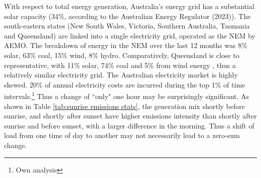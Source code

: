 With respect to total energy generation, Australia's energy grid has a substantial solar capacity (34\%, according to the Australian Energy Regulator (2023)\nocite{state_of_the_market}). The south-eastern states (New South Wales, Victoria, Southern Australia, Tasmania and Queensland) are linked into a single electricity grid, operated as the \ac{NEM} by \ac{AEMO}. 
The breakdown of energy in the \ac{NEM} over the last 12 months was 8\% solar, 63\% coal, 15\% wind, 8\% hydro.
Comparatively, Queensland is close to representative, with 11\%  solar, 74\% coal and 5\% from wind energy \parencite{aemo_fuel_mix}, thus a relatively similar electricity grid.
The Australian electricity market is highly skewed.
20\% of annual electricity costs are incurred during the top 1\% of time intervals.\footnote{Own analysis}
Thus a change of ``only" one hour may be surprisingly significant. As shown in Table \ref{tab:sunrise emissions stats}, the generation mix shortly before sunrise, and shortly after sunset have higher emissions intensity than shortly after sunrise and before sunset, with a larger difference in the morning. Thus a shift of load from one time of day to another may not necessarily lead to a zero-sum change.

